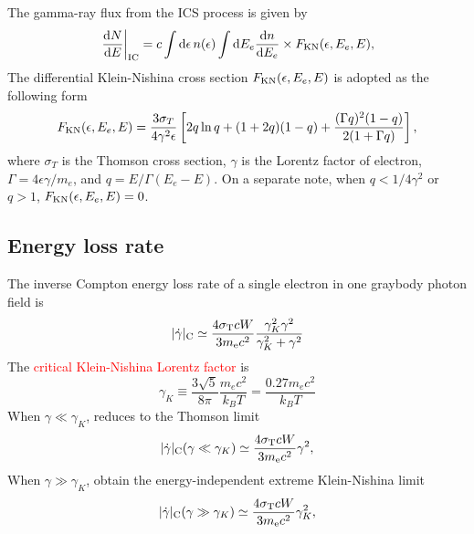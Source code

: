 \documentclass[12pt,a4paper]{article}
\begin{document}
The gamma-ray flux from the ICS process is given by
\begin{equation}
\left.\frac{{\rm d}N}{{\rm d}E}\right|_{\rm IC}= c \int {\rm d}\epsilon\,
n(\epsilon)\int {\rm d}E_e \frac{{\rm d}n}{{\rm d}E_e} \times
F_{\rm KN}(\epsilon,E_e,E),
\end{equation}
The differential Klein-Nishina cross section $F_{\rm KN}(\epsilon,E_e,E)$ is adopted as the following form \cite{1968PhRv..167.1159J, 1970RvMP...42..237B}
\begin{equation}
F_{\rm KN}(\epsilon,E_e,E)=\frac{3\sigma_T}{4\gamma^2\epsilon}\left[2q
\ln{q}+(1+2q)(1-q)+\frac{(\Gamma q)^2(1-q)}{2(1+\Gamma q)}\right],
\end{equation}
where $\sigma_T$ is the Thomson cross section, $\gamma$ is the Lorentz factor
of electron, $\Gamma=4\epsilon\gamma/m_e$, and $q=E/\Gamma(E_e-E)$. On a separate note, when $q<1/4\gamma^2$ or $q>1$, $F_{\rm KN}(\epsilon,E_e,E)=0$.

\subsection{Energy loss rate}
The inverse Compton energy loss rate of a single electron in one graybody photon field is
\begin{equation}
|\dot{\gamma}|_{\rm C} \simeq \frac{4\sigma_{\rm T} c W}{3m_{\rm e} c^2} \frac{\gamma_K^2 \gamma^2}{\gamma_K^2 +\gamma^2}
\end{equation}
The \textcolor{red}{critical Klein-Nishina Lorentz factor} is
\begin{equation}
\gamma_K \equiv \frac{3\sqrt{5}}{8\pi} \frac{m_e c^2}{k_B T} = \frac{0.27 m_e c^2}{k_B T}
\end{equation}
When $\gamma \ll \gamma_K$, reduces to the Thomson limit
\begin{equation}
|\dot{\gamma}|_{\rm C}(\gamma \ll \gamma_K) \simeq \frac{4\sigma_{\rm T} c W}{3m_{\rm e} c^2} \gamma^2 ,
\end{equation}
When $\gamma \gg \gamma_K$, obtain the energy-independent extreme Klein-Nishina limit
\begin{equation}
|\dot{\gamma}|_{\rm C}(\gamma \gg \gamma_K) \simeq \frac{4\sigma_{\rm T} c W}{3m_{\rm e} c^2} \gamma_K^2 ,
\end{equation}














































\end{document}
